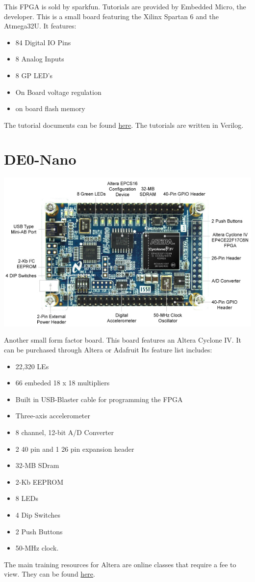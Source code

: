 \documentclass{article}
\begin{document}
	This FPGA is sold by sparkfun. Tutorials are provided by Embedded Micro, the developer. This is a small board featuring
	the Xilinx Spartan 6 and the Atmega32U. It features:
		\begin{itemize}
		\item 84 Digital IO Pins
		\item 8 Analog Inputs
		\item 8 GP LED's
		\item On Board voltage regulation
		\item on board flash memory
		\end{itemize}
	The tutorial documents can be found \href{https://embeddedmicro.com/tutorials/mojo/}{here}. The tutorials are written in
	Verilog. 
	
	\newpage
	\section{DE0-Nano}
	\includegraphics[scale=0.5]{de0}

	Another small form factor board. This board features an Altera Cyclone IV. It can be purchased through Altera or Adafruit
	Its feature list includes:
		\begin{itemize}
		\item 22,320 LEs
		\item 66 embeded 18 x 18 multipliers
		\item Built in USB-Blaster cable for programming the FPGA
		\item Three-axis accelerometer
		\item 8 channel, 12-bit A/D Converter
		\item 2 40 pin and 1 26 pin expansion header
		\item 32-MB SDram
		\item 2-Kb EEPROM
		\item 8 LEDs
		\item 4 Dip Switches
		\item 2 Push Buttons
		\item 50-MHz clock. 	
		\end{itemize}	
	The main training resources for Altera are online classes that require a fee to view. They can be found
	\href{https://www.altera.com/support/training/curricula.html}{here}.
\end{document}
